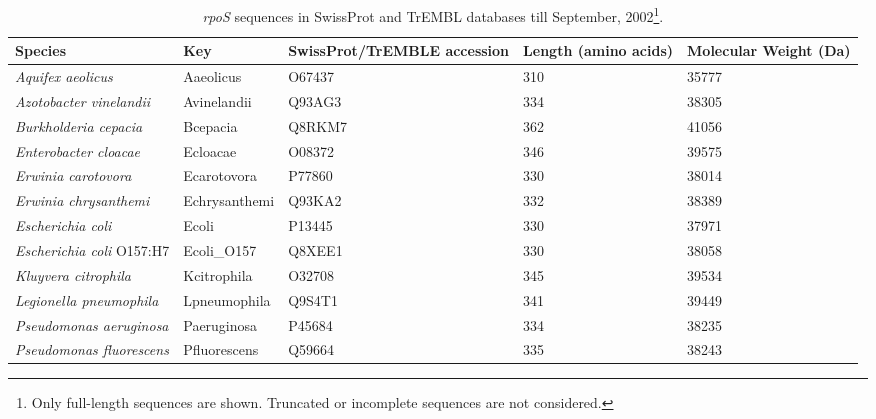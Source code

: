 \begin{table}
\begin{minipage}[c]{\textwidth}
\renewcommand{\footnoterule}{}
\caption[Known \emph{rpoS} sequences]{\emph{rpoS} sequences in
SwissProt and TrEMBL databases till September,
2002\protect\footnote{Only full-length sequences are shown.
Truncated or incomplete sequences are not considered.}.}
\label{chap4:rpos_table}
\begin{narrow}{-1in}{-1in}
\centering
\begin{small}
\begin{tabular}{@{}llp{.8in}p{.8in}p{.7in}@{}}\toprule
\textbf{Species} & \textbf{Key} & \textbf{Swiss\-Prot/\-Tr\-EMBLE
accession} & \textbf{Length (amino acids)} & \textbf{Molecular
Weight (Da)}\\\midrule\addlinespace
{\it Aquifex aeolicus} & Aaeolicus & O67437 & 310 & 35777 \\

{\it Azotobacter vinelandii} & Avinelandii & Q93AG3 & 334 & 38305 \\

{\it Burkholderia cepacia}  & Bcepacia & Q8RKM7 & 362 & 41056 \\

{\it Enterobacter cloacae} & Ecloacae & O08372 & 346 & 39575 \\

{\it Erwinia carotovora} & Ecarotovora & P77860 & 330 & 38014 \\

{\it Erwinia chrysanthemi} & Echrysanthemi & Q93KA2 & 332 & 38389 \\

{\it Escherichia coli} & Ecoli & P13445 & 330 & 37971 \\

{\it Escherichia coli} O157:H7 & Ecoli\_O157 & Q8XEE1 & 330 & 38058 \\

{\it Kluyvera citrophila } & Kcitrophila & O32708 & 345 & 39534 \\

{\it Legionella pneumophila} & Lpneumophila & Q9S4T1 & 341 & 39449 \\

{\it Pseudomonas aeruginosa} & Paeruginosa & P45684 & 334 & 38235 \\

{\it Pseudomonas fluorescens} & Pfluorescens & Q59664 & 335 & 38243 \\


\end{tabular}
\end{small}
\end{narrow}
\end{minipage}
\end{table}
